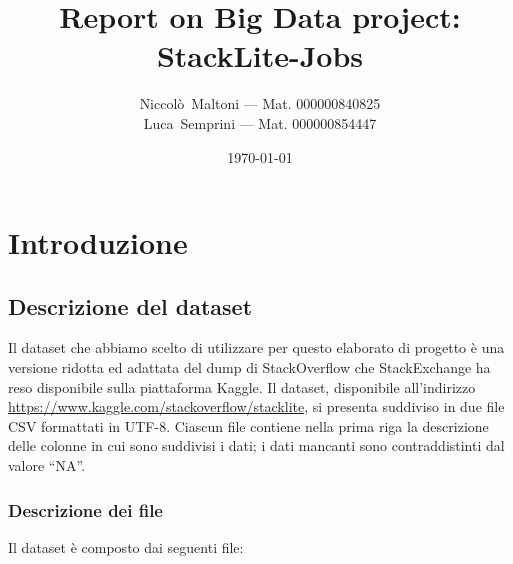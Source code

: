 \documentclass[
  a4paper,            %
  10pt                %
]{article}
\title{\textbf{Report on Big Data project: \\StackLite-Jobs}}
\author{
  Niccolò~Maltoni --- Mat. 000000840825\\%
  Luca~Semprini --- Mat. 000000854447
}
\date{\today}
\begin{document}
  \maketitle
  \newpage

  \tableofcontents

  \newpage

  \section{Introduzione}\label{sec:intro}
  \subsection{Descrizione del dataset}\label{subsec:dataset}

  Il dataset che abbiamo scelto di utilizzare per questo elaborato di progetto è una versione ridotta ed adattata del dump di StackOverflow che StackExchange ha reso disponibile sulla piattaforma Kaggle.
  Il dataset, disponibile all'indirizzo \url{https://www.kaggle.com/stackoverflow/stacklite}, si presenta suddiviso in due file CSV formattati in UTF-8.
  Ciascun file contiene nella prima riga la descrizione delle colonne in cui sono suddivisi i dati;
  i dati mancanti sono contraddistinti dal valore ``NA''.

  \subsubsection{Descrizione dei file}\label{subsub:dataset:files}

  Il dataset è composto dai seguenti file:
\end{document}
